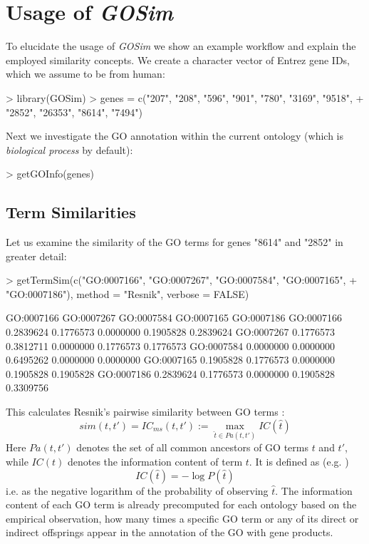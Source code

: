 \documentclass[12pt,a4paper]{article}
\begin{document}
\section{Usage of \emph{GOSim}}

To elucidate the usage of \emph{GOSim} we show an example workflow and explain the employed similarity concepts. We create  a character vector of Entrez gene IDs, which we assume to be from human:
\begin{Schunk}
\begin{Sinput}
> library(GOSim)
> genes = c("207", "208", "596", "901", "780", "3169", "9518", 
+     "2852", "26353", "8614", "7494")
\end{Sinput}
\end{Schunk}
Next we investigate the GO annotation within the current ontology (which is \emph{biological process} by default):
\begin{Schunk}
\begin{Sinput}
> getGOInfo(genes)
\end{Sinput}
\end{Schunk}

\subsection{Term Similarities}

Let us examine the similarity of the GO terms for genes "8614" and "2852" in greater detail:
\begin{Schunk}
\begin{Sinput}
> getTermSim(c("GO:0007166", "GO:0007267", "GO:0007584", "GO:0007165", 
+     "GO:0007186"), method = "Resnik", verbose = FALSE)
\end{Sinput}
\begin{Soutput}
           GO:0007166 GO:0007267 GO:0007584 GO:0007165 GO:0007186
GO:0007166  0.2839624  0.1776573  0.0000000  0.1905828  0.2839624
GO:0007267  0.1776573  0.3812711  0.0000000  0.1776573  0.1776573
GO:0007584  0.0000000  0.0000000  0.6495262  0.0000000  0.0000000
GO:0007165  0.1905828  0.1776573  0.0000000  0.1905828  0.1905828
GO:0007186  0.2839624  0.1776573  0.0000000  0.1905828  0.3309756
\end{Soutput}
\end{Schunk}
This calculates Resnik's pairwise similarity between GO terms \cite{Resnik95,Resnik99}:
\begin{equation}
sim(t,t') = IC_{ms}(t,t') := \max_{\hat{t}\in Pa(t,t')} IC(\hat{t})\label{eq:Resnik}
\end{equation}
Here $Pa(t,t')$ denotes the set of all common ancestors of GO terms $t$ and $t'$, while $IC(t)$  denotes the information content of term $t$. It is defined as (e.g. \cite{Lord03})
\begin{equation}
IC(\hat{t}) = -\log P(\hat{t})
\end{equation}
i.e. as the negative logarithm of the probability of observing $\hat{t}$. The information content of each GO term is already precomputed for each ontology based on the empirical observation, how many times a specific GO term or any of its direct or indirect offsprings appear in the annotation of the GO with gene products. 
\end{document}
